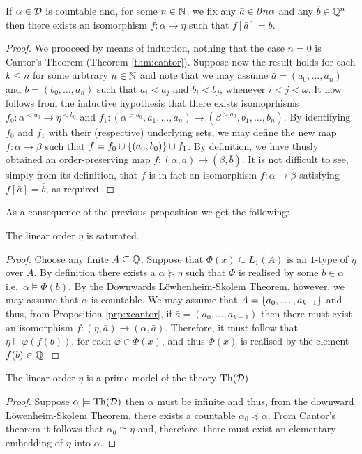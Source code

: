 \begin{prp}\label{prp:xcantor}
	If $\alpha\in\mathcal{D}$ is countable and, for some $n\in\mathbb{N}$, we fix any $\bar{a}\in\partial^{}{n}\alpha$ and any $\bar{b}\in\mathbb{Q}^n$ then there exists an isomorphism $f\colon\alpha\to\eta$ such that $f[\bar{a}]=\bar{b}$.
\end{prp}
\begin{proof}
	We prooceed by means of induction, nothing that the case $n=0$ is Cantor's
	Theorem (Theorem \ref{thm:cantor}).  Suppose now the result holds for each
	$k\leq n$ for some arbtrary $n\in\mathbb{N}$ and note that we may assume
	$\bar{a}=(a_0,\dotsc,a_n)$ and $\bar{b}=(b_0,\dotsc,a_n)$ such that $a_i<a_j$
	and $b_i<b_j$, whenever $i<j<\omega$.  It now follows from the inductive
	hypothesis that there exists isomoprhisms $f_0\colon\alpha^{<a_0}\to\eta^{<b_0}$
	and $f_1\colon(\alpha^{>a_0},a_1,\dotsc,a_n)\to(\beta^{>a_0},b_1,\dotsc,b_n)$.
	By identifying $f_0$ and $f_1$ with their (respective) underlying sets, we may
	define the new map $f\colon\alpha\to\beta$ such that
	$f=f_0\cup\left\lbrace (a_0,b_0)\right\rbrace\cup f_1$.  By definition, we have thusly obtained an
	order-preserving map $f\colon(\alpha,\bar{a})\to(\beta,\bar{b})$.  It is not
	difficult to see, simply from its definition, that $f$ is in fact an isomorphism
	$f\colon\alpha\to\beta$ satisfying $f[\bar{a}]=\bar{b}$, as required.
\end{proof}

As a consequence of the previous proposition we get the following:
\begin{prp}
	The linear order $\eta$ is saturated.
\end{prp}
\begin{proof}
	Choose any finite $A\subseteq\mathbb{Q}$.  Suppose that $\Phi(x)\subseteq L_1(A)$ is an $1$-type of $\eta$ over $A$.  By definition there exists a $\alpha\succcurlyeq\eta$ such that $\Phi$ is realised by some $b\in\alpha$ i.e.\ $\alpha\models\Phi(b)$.  By the Downwards L\"owhenheim-Skolem Theorem, however, we may assume that $\alpha$ is countable.  We may assume that $A=\left\lbrace a_0,\dotsc,a_{k-1}\right\rbrace$ and thus, from Proposition \ref{prp:xcantor}, if $\bar{a}=(a_0,\dotsc,a_{k-1})$ then there must exist an isomorphism $f\colon(\eta,\bar{a})\to(\alpha,\bar{a})$.  Therefore, it must follow that $\eta\models\varphi(f(b))$, for each $\varphi\in\Phi(x)$, and thus $\Phi(x)$ is realised by the element $f(b)\in\mathbb{Q}$.
\end{proof}


\begin{thm}
	The linear order $\eta$ is a prime model of the theory $\operatorname{Th}(\mathcal{D})$.
\end{thm}
\begin{proof}
	Suppose $\alpha\models\operatorname{Th}(\mathcal{D})$ then $\alpha$ must be infinite and thus, from the downward L\"owenheim-Skolem Theorem, there exists a countable $\alpha_0\preccurlyeq\alpha$.  From Cantor's theorem it follows that $\alpha_0\cong\eta$ and, therefore, there must exist an elementary embedding of $\eta$ into $\alpha$.
\end{proof}

